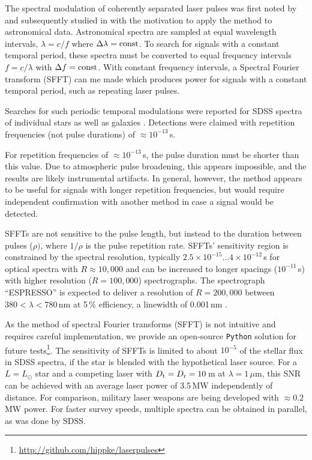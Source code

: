 \documentclass[twocolumn,tighten,longauthor]{myaastex62}
\begin{document}
The spectral modulation of coherently separated laser pulses was first noted by \citet{1992ApOpt..31.3383C} and subsequently studied in \citet{2010ApJ...715..589B,2010A&A...511L...6B,2012AJ....144..181B} with the motivation to apply the method to astronomical data. Astronomical spectra are sampled at equal wavelength intervals, $\lambda = c/f$ where $\Delta \lambda={\rm const}$. To search for signals with a constant temporal period, these spectra must be converted to equal frequency intervals $f=c/\lambda$ with $\Delta f ={\rm const}$. With constant frequency intervals, a Spectral Fourier transform (SFFT) can me made which produces power for signals with a constant temporal period, such as repeating laser pulses.

Searches for such periodic temporal modulations were reported for SDSS spectra of individual stars \citep{2016PASP..128k4201B,2017JApA...38...23B} as well as galaxies \citep{2013ApJ...774..142B}. Detections were claimed with repetition frequencies (not pulse durations) of $\approx 10^{-13}\,$s.

For repetition frequencies of $\approx 10^{-13}\,$s, the pulse duration must be shorter than this value. Due to atmospheric pulse broadening, this appears impossible, and the results are likely instrumental artifacts. In general, however, the method appears to be useful for signals with longer repetition frequencies, but would require independent confirmation with another method in case a signal would be detected.

SFFTs are not sensitive to the pulse length, but instead to the duration between pulses ($\rho)$, where $1/\rho$ is the pulse repetition rate. SFFTs' sensitivity region is constrained by the spectral resolution, typically $2.5\times10^{-15} \dots 4\times10^{-12}\,$s for optical spectra with $R\approx10{,}000$ and can be increased to longer spacings ($10^{-11}\,$s) with higher resolution ($R=100{,}000$) spectrographs. The spectrograph ``ESPRESSO'' is expected to deliver a resolution of $R=200{,}000$ between $380<\lambda<780$\,nm at 5\,\% efficiency, a linewidth of 0.001\,nm \citep{2017arXiv171105250G}.

As the method of spectral Fourier transforms (SFFT) is not intuitive and requires careful implementation, we provide an open-source \texttt{Python} solution for future tests\footnote{\url{http://github.com/hippke/laserpulses}}.
The sensitivity of SFFTs is limited to about $10^{-5}$ of the stellar flux in SDSS spectra, if the star is blended with the hypothetical laser source. For a $L=L_{\odot}$ star and a competing laser with $D_{\rm t}=D_{\rm r}=10\,$m at $\lambda=1\,\mu$m, this SNR can be achieved with an average laser power of 3.5\,MW independently of distance. For comparison, military laser weapons are being developed with $\approx0.2\,$MW power. For faster survey speeds, multiple spectra can be obtained in parallel, as was done by SDSS.
\end{document}
